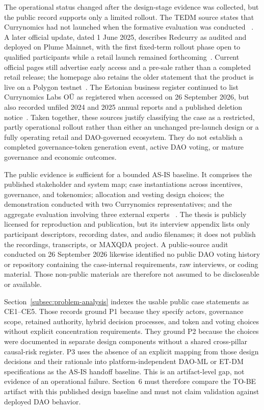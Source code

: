 \documentclass[referee,sn-basic]{sn-jnl}
\begin{document}
The operational status changed after the design-stage evidence was collected,
but the public record supports only a limited rollout. The TEDM source states
that Currynomics had not launched when the formative evaluation was conducted
~\cite{Kivilo2026Designing}. A later official update, dated 1 June 2025,
describes Redcurry as audited and deployed on Plume Mainnet, with the first
fixed-term rollout phase open to qualified participants while a retail launch
remained forthcoming~\cite{RedCurry2025Rollout}. Current official pages still
advertise early access and a pre-sale rather than a completed retail release;
the homepage also retains the older statement that the product is live on a
Polygon testnet~\cite{RedCurry2026Homepage,RedCurry2026Presale}. The Estonian
business register continued to list Currynomics Labs OÜ as registered when
accessed on 26 September 2026, but also recorded unfiled 2024 and 2025 annual
reports and a published deletion notice~\cite{EstonianBusinessRegister2026}.
Taken together, these sources justify classifying the case as a restricted,
partly operational rollout rather than either an unchanged pre-launch design
or a fully operating retail and DAO-governed ecosystem. They do not establish
a completed governance-token generation event, active DAO voting, or mature
governance and economic outcomes.

The public evidence is sufficient for a bounded AS-IS baseline. It comprises
the published stakeholder and system map; case instantiations across
incentives, governance, and tokenomics; allocation and vesting design choices;
the demonstration conducted with two Currynomics representatives; and the
aggregate evaluation involving three external experts
~\cite{Kivilo2023TokenEconomy,Kivilo2026Designing}. The thesis is publicly
licensed for reproduction and publication, but its interview appendix lists
only participant descriptors, recording dates, and audio filenames; it does
not publish the recordings, transcripts, or MAXQDA project. A public-source
audit conducted on 26 September 2026 likewise identified no public DAO voting
history or repository containing the case-internal requirements, raw
interviews, or coding material. Those non-public materials are therefore not
assumed to be discloseable or available.

Section~\ref{subsec:problem-analysis} indexes the usable public case statements
as CE1--CE5. Those records ground P1 because they specify actors, governance
scope, retained authority, hybrid decision processes, and token and voting
choices without explicit concentration requirements. They ground P2 because
the choices were documented in separate design components without a shared
cross-pillar causal-risk register. P3 uses the absence of an explicit mapping
from those design decisions and their rationale into platform-independent
DAO-ML or ET-DM specifications as the AS-IS handoff baseline. This is an
artifact-level gap, not evidence of an operational failure. Section~6 must
therefore compare the TO-BE artifact with this published design baseline and
must not claim validation against deployed DAO behavior.
\end{document}
